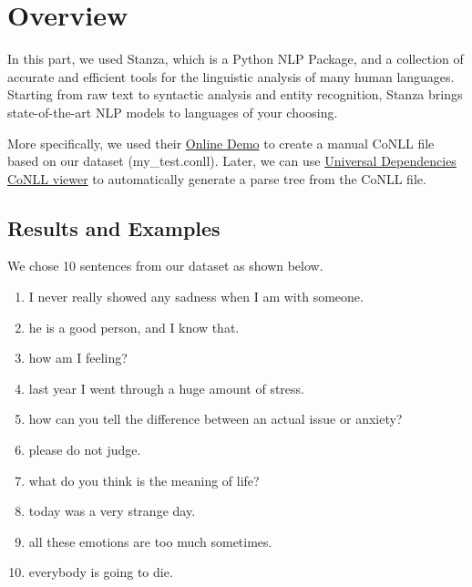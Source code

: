 \documentclass[12pt, a4paper]{article}
\begin{document}
	\section{Overview}
	In this part, we used Stanza, which is a Python NLP Package, and a collection of accurate and efficient tools for the linguistic analysis of many human languages. Starting from raw text to syntactic analysis and entity recognition, Stanza brings state-of-the-art NLP models to languages of your choosing.
	
	More specifically, we used their \href{http://stanza.run/}{Online Demo} to create a manual CoNLL file based on our dataset (my\_test.conll). Later, we can use \href{https://universaldependencies.org/conllu_viewer.html}{Universal Dependencies CoNLL viewer} to automatically generate a parse tree from the CoNLL file.
	
	\subsection{Results and Examples}
	We chose 10 sentences from our dataset as shown below.
	\begin{enumerate}
		\item I never really showed any sadness when I am with someone.
		\item he is a good person, and I know that.
		\item how am I feeling?
		\item last year I went through a huge amount of stress.
		\item how can you tell the difference between an actual issue or anxiety?
		\item please do not judge.
		\item what do you think is the meaning of life?
		\item today was a very strange day.
		\item all these emotions are too much sometimes. 
		\item everybody is going to die.
	\end{enumerate}
	
\end{document}
